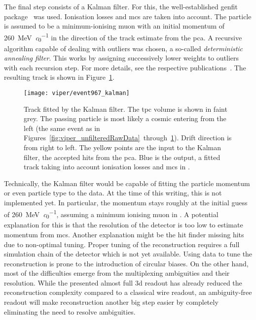 The final step consists of a Kalman filter.
For this, the well-established \gls{genfit} package~\cite{genfit1, genfit2} was used.
Ionisation losses and \gls{mcs} are taken into account.
The particle is assumed to be a minimum-ionising muon with an initial momentum of \SI{260}{\mega\electronvolt\per\clight} in the direction of the track estimate from the \gls{pca}.
A recursive algorithm capable of dealing with outliers was chosen, a so-called \emph{deterministic annealing filter}.
This works by assigning successively lower weights to outliers with each recursion step.
For more details, see the respective publications~\cite{genfit1, genfit2}.
The resulting track is shown in Figure~\ref{fig:viper_kalman}.

\begin{figure}[htb]
	\centering
	\texttt{[image: viper/event967\_kalman]}
	\caption[Kalman-fitted track of typical pixel demonstrator event]{%
		Track fitted by the Kalman filter.
		The \acrshort{tpc} volume is shown in faint grey.
		The passing particle is most likely a cosmic \Pgm entering from the left (the same event as in Figures~\ref{fig:viper_unfilteredRawData}~through~\ref{fig:viper_kalman}).
		Drift direction is from right to left.
		The yellow points are the input to the Kalman filter, the accepted hits from the \acrshort{pca}.
		Blue is the output, a fitted track taking into account ionisation losses and \acrshort{mcs} in \lar{}.
	}
	\label{fig:viper_kalman}
\end{figure}

Technically, the Kalman filter would be capable of fitting the particle momentum or even particle type to the data.
At the time of this writing, this is not implemented yet.
In particular, the momentum stays roughly at the initial guess of \SI{260}{\mega\electronvolt\per\clight}, assuming a minimum ionising muon in \lar{}.
A potential explanation for this is that the resolution of the detector is too low to estimate momentum from \gls{mcs}.
Another explanation might be the hit finder missing hits due to non-optimal tuning.
Proper tuning of the reconstruction requires a full simulation chain of the detector which is not yet available.
Using data to tune the reconstruction is prone to the introduction of circular biases.
On the other hand, most of the difficulties emerge from the multiplexing ambiguities and their resolution.
While the presented almost full \gls{3d} readout has already reduced the reconstruction complexity compared to a classical wire readout, an ambiguity-free readout will make reconstruction another big step easier by completely eliminating the need to resolve ambiguities.


